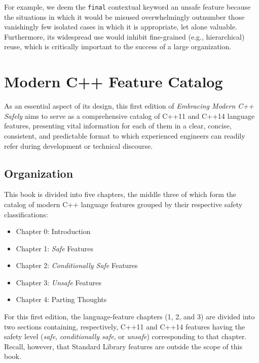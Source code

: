 For example, we deem the \lstinline!final! contextual keyword an unsafe feature because the situations in which it would be misused overwhelmingly outnumber those vanishingly few isolated cases in which it is appropriate, let alone valuable. Furthermore, its widespread use would inhibit fine-grained (e.g., hierarchical) reuse, which is critically important to the success of a large organization.%

\section{Modern C++ Feature Catalog}

As an essential aspect of its design, this first edition of \textit{Embracing Modern C++ Safely} aims to serve as a comprehensive catalog of C++11 and C++14 language features, presenting vital information for each of them in a clear, concise, consistent, and predictable format to which experienced engineers can readily refer during development or technical discourse.

\subsection{Organization}

This book is divided into five chapters, the middle three of which form the catalog of modern C++ language features grouped by their respective safety classifications:
\begin{itemize}
\item{ Chapter 0: Introduction}
\item{Chapter 1: \emph{Safe} Features}
\item{Chapter 2: \emph{Conditionally Safe} Features}
\item{Chapter 3: \emph{Unsafe} Features}
\item{Chapter 4: Parting Thoughts}
\end{itemize}
For this first edition, the language-feature chapters (1, 2, and 3) are divided into two sections containing, respectively, C++11 and C++14 features having the safety level (\emph{safe}, \emph{conditionally safe}, or \emph{unsafe}) corresponding to that chapter. Recall, however, that Standard Library features are outside the scope of this book.


